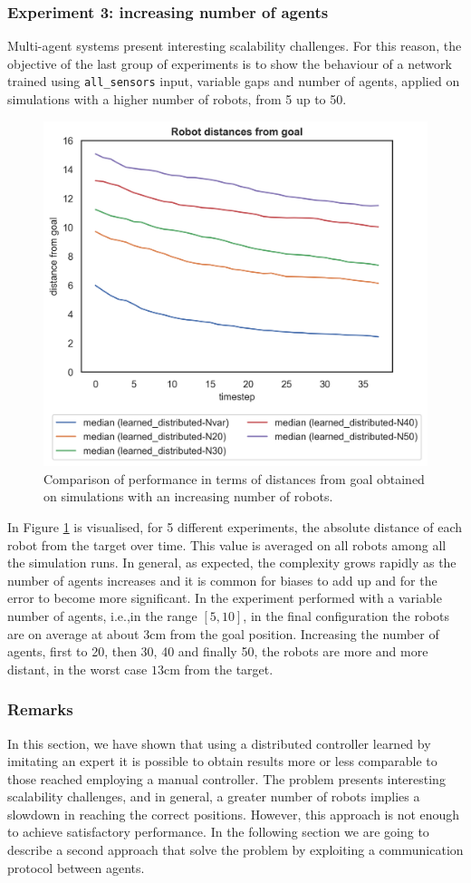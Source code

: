 \subsubsection{Experiment 3: increasing number of agents}
\label{subsubsec:task1-exp-distr-3}
Multi-agent systems present interesting scalability challenges. For this reason, the 
objective of the last group of experiments is to show the behaviour of a network 
trained using \texttt{all\_sensors} input, variable gaps and number of agents, 
applied on simulations with a higher number of robots, from 5 up to 50.
\begin{figure}[!htb]
	\centering
	\includegraphics[width=.5\textwidth]{contents/images/distances-from-goal-compressed-distributed}%
	\caption[Evaluation of distances from goal for a high number of 
	robots.]{Comparison of performance in terms of distances from goal obtained 
	on simulations with an increasing number of robots.}
	\label{fig:distdistr}
\end{figure}
In Figure \ref{fig:distdistr} is visualised, for 5 different experiments, the absolute 
distance of each robot from the target over time. This value is averaged on all 
robots among all the simulation runs. 
In general, as expected, the complexity grows rapidly as the number of agents 
increases and it is common for biases to add up and for the error to become more 
significant.
In the experiment performed with a variable number of agents, i.e.,in the range 
$[5, 10]$, in the final configuration the robots are on average at about $3$cm 
from the goal position. Increasing the number of agents, first to 20, then 30, 40 
and finally 50, the robots are more and more distant, in the worst case $13$cm 
from the target.


\subsubsection{Remarks}
\label{subsubsec:remarks-task1-dist}
In this section, we have shown that using a distributed controller learned by 
imitating an expert it is possible to obtain results more or less comparable to 
those reached employing a manual controller.
The problem presents interesting scalability challenges, and in general, a greater 
number of robots implies a slowdown in reaching the correct positions.
However, this approach is not enough to achieve satisfactory performance. In the 
following section we are going to describe a second approach that solve the 
problem by exploiting a communication protocol between agents.